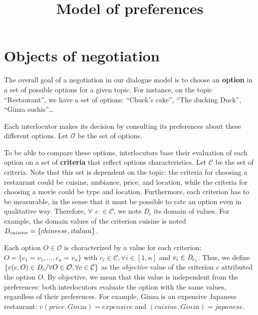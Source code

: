 \documentclass{llncs}
\begin{document}
\title{ Model of preferences}
\maketitle 



\section{Objects of negotiation}
\par The overall goal of a negotiation in our dialogue model is to choose an \textbf{option} in a set of possible options for a given topic. For instance, on the topic ``Restaurant'', we have a set of options: ``Chuck's cake'', ``The ducking Duck'', ``Ginza sushis''\ldots 
\par Each interlocutor makes its decision by consulting its preferences about these different options. Let $\mathcal{O}$ be the set of options.

To be able to compare these options, interlocutors base their evaluation of each option on a set of \textbf{criteria} that reflect options characteristics.
Let $\mathcal{C}$ be the set of criteria. 
Note that this set is dependent on the topic: the criteria for choosing a restaurant could be cuisine, ambiance, price, and location, while the criteria for choosing a movie could be type and location. 
Furthermore, each criterion has to be measurable, in the sense that it must be possible to rate an option even in qualitative way. Therefore, $\forall$ \emph{c $\in\mathcal{ C}$},  we note \emph{D$_c$} its  domain of values. For example, the domain  values of the criterion cuisine is noted $\emph{D}_{cuisine} = \{chineese, italian\}$.

Each option $O\in \mathcal{O}$ is characterized by a value for each criterion:
 $O = \{c_1=v_1,..., c_n=v_n\}$ with $c_i \in \mathcal{C}, \forall i \in [1,n]$ and $v_i\in \emph{D}_{c_i}$. 
 Thus, we define $\{v(c,O) \in \emph{D}_{c} / \forall O \in \mathcal{O}, \forall c \in \mathcal{C}\}$ as the \emph{objective} value of the criterion $c$ attributed  the option $O$. 
By objective, we mean that this value is independent from the preferences: both interlocutors evaluate the option with the same values, regardless of their preferences. 
For example, Ginza is an expensive Japanese restaurant: $v(price, Ginza) = expensive$ and $(cuisine, Ginza) = japanese$. 
\end{document}
